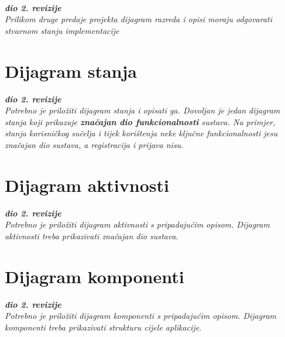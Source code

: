 			\

			\textbf{\textit{dio 2. revizije}}\\			
			
			\textit{Prilikom druge predaje projekta dijagram razreda i opisi moraju odgovarati stvarnom stanju implementacije}
			
			
			
			\eject
		
		\section{Dijagram stanja}
			
			
			\textbf{\textit{dio 2. revizije}}\\
			
			\textit{Potrebno je priložiti dijagram stanja i opisati ga. Dovoljan je jedan dijagram stanja koji prikazuje \textbf{značajan dio funkcionalnosti} sustava. Na primjer, stanja korisničkog sučelja i tijek korištenja neke ključne funkcionalnosti jesu značajan dio sustava, a registracija i prijava nisu. }
			
			
			\eject 
		
		\section{Dijagram aktivnosti}
			
			\textbf{\textit{dio 2. revizije}}\\
			
			 \textit{Potrebno je priložiti dijagram aktivnosti s pripadajućim opisom. Dijagram aktivnosti treba prikazivati značajan dio sustava.}
			
			\eject
		\section{Dijagram komponenti}
		
			\textbf{\textit{dio 2. revizije}}\\
		
			 \textit{Potrebno je priložiti dijagram komponenti s pripadajućim opisom. Dijagram komponenti treba prikazivati strukturu cijele aplikacije.}